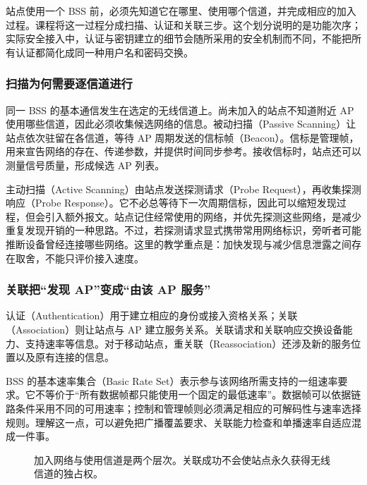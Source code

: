 站点使用一个 BSS 前，必须先知道它在哪里、使用哪个信道，并完成相应的加入过程。课程将这一过程分成扫描、认证和关联三步。这个划分说明的是功能次序；实际安全接入中，认证与密钥建立的细节会随所采用的安全机制而不同，不能把所有认证都简化成同一种用户名和密码交换。

\subsubsection{扫描为何需要逐信道进行}

同一 BSS 的基本通信发生在选定的无线信道上。尚未加入的站点不知道附近 AP 使用哪些信道，因此必须收集候选网络的信息。被动扫描（Passive Scanning）让站点依次驻留在各信道，等待 AP 周期发送的信标帧（Beacon）。信标是管理帧，用来宣告网络的存在、传递参数，并提供时间同步参考。接收信标时，站点还可以测量信号质量，形成候选 AP 列表。

主动扫描（Active Scanning）由站点发送探测请求（Probe Request），再收集探测响应（Probe Response）。它不必总等待下一次周期信标，因此可以缩短发现过程，但会引入额外报文。站点记住经常使用的网络，并优先探测这些网络，是减少重复发现开销的一种思路。不过，若探测请求显式携带常用网络标识，旁听者可能推断设备曾经连接哪些网络。这里的教学重点是：加快发现与减少信息泄露之间存在取舍，不能只评价接入速度。

\subsubsection{关联把“发现 AP”变成“由该 AP 服务”}

认证（Authentication）用于建立相应的身份或接入资格关系；关联（Association）则让站点与 AP 建立服务关系。关联请求和关联响应交换设备能力、支持速率等信息。对于移动站点，重关联（Reassociation）还涉及新的服务位置以及原有连接的信息。

BSS 的基本速率集合（Basic Rate Set）表示参与该网络所需支持的一组速率要求。它不等价于“所有数据帧都只能使用一个固定的最低速率”。数据帧可以依据链路条件采用不同的可用速率；控制和管理帧则必须满足相应的可解码性与速率选择规则。理解这一点，可以避免把广播覆盖要求、关联能力检查和单播速率自适应混成一件事。

\begin{figure}[htbp]
\centering
{}
\caption{加入网络与使用信道是两个层次。关联成功不会使站点永久获得无线信道的独占权。}
\end{figure}

